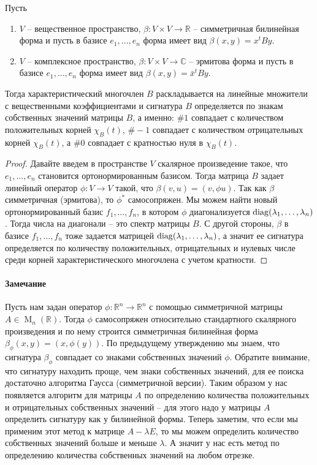 \begin{claim}
Пусть 
\begin{enumerate}
\item
$V$ -- вещественное пространство, $\beta\colon V\times V\to \mathbb R$ -- симметричная билинейная форма и пусть в базисе $e_1,\ldots,e_n$ форма имеет вид $\beta(x, y) = x^t B y$.

\item
$V$ -- комплексное пространство, $\beta\colon V\times V\to \mathbb C$ -- эрмитова форма и пусть в базисе $e_1,\ldots,e_n$ форма имеет вид $\beta(x, y) = \bar x^t B y$.

\end{enumerate}
Тогда характеристический многочлен $B$ раскладывается на линейные множители с вещественными коэффициентами и сигнатура $B$ определяется по знакам собственных значений матрицы $B$, а именно: $\#1$ совпадает с количеством положительных корней $\chi_B(t)$, $\#-1$ совпадает с количеством отрицательных корней $\chi_B(t)$, а $\#0$ совпадает с кратностью нуля в $\chi_B(t)$.
\end{claim}
\begin{proof}
Давайте введем в пространстве $V$ скалярное произведение такое, что $e_1,\ldots,e_n$ становится ортонормированным базисом.
Тогда матрица $B$ задает линейный оператор $\phi\colon V \to V$ такой, что $\beta(v, u) = (v, \phi u)$.
Так как $\beta$ симметричная (эрмитова), то $\phi^*$ самосопряжен.
Мы можем найти новый ортонормированный базис $f_1,\ldots,f_n$, в котором $\phi$ диагонализуется $\operatorname{diag}(\lambda_1,\ldots,\lambda_n)$.
Тогда числа на диагонали -- это спектр матрицы $B$.
С другой стороны, $\beta$ в базисе $f_1,\ldots,f_n$ тоже задается матрицей $\operatorname{diag}(\lambda_1,\ldots,\lambda_n)$, а значит ее сигнатура определяется по количеству положительных, отрицательных и нулевых числе среди корней характеристического многочлена с учетом кратности.
\end{proof}

\paragraph{Замечание}

Пусть нам задан оператор $\phi\colon \mathbb R^n\to \mathbb R^n$ с помощью симметричной матрицы $A\in \operatorname{M}_n(\mathbb R)$.
Тогда $\phi$ самосопряжен относительно стандартного скалярного произведения и по нему строится симметричная билинейная форма $\beta_\phi(x, y) = (x, \phi (y))$.
По предыдущему утверждению мы знаем, что сигнатура $\beta_\phi$ совпадает со знаками собственных значений $\phi$.
Обратите внимание, что сигнатуру находить проще, чем знаки собственных значений, для ее поиска достаточно алгоритма Гаусса (симметричной версии).
Таким образом у нас появляется алгоритм для матрицы $A$ по определению количества положительных и отрицательных собственных значений -- для этого надо у матрицы $A$ определить сигнатуру как у билинейной формы.
Теперь заметим, что если мы применим этот метод к матрице $A - \lambda E$, то мы можем определить количество собственных значений больше и меньше $\lambda$.
А значит у нас есть метод по определению количества собственных значений на любом отрезке.

